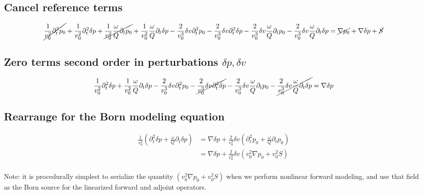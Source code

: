 \documentclass[10pt,fleqn]{article}
\begin{document}
\subsection{Cancel reference terms}
\begin{equation}
  \cancel{ \frac{1}{v_0^2} \partial_t^2 p_0 }
+ \frac{1}{v_0^2} \partial_t^2 \delta p
+ \cancel{ \frac{1}{v_0^2} \frac{\omega}{Q} \partial_t p_0 }
+ \frac{1}{v_0^2} \frac{\omega}{Q} \partial_t \delta p
- \frac{2}{v_0^3} \delta v \partial_t^2 p_0
- \frac{2}{v_0^3} \delta v \partial_t^2 \delta p 
- \frac{2}{v_0^3} \delta v \frac{\omega}{Q} \partial_t p_0
- \frac{2}{v_0^3} \delta v \frac{\omega}{Q} \partial_t \delta p 
= \cancel{ \nabla p_0 } + \nabla \delta p + \cancel{ S }
\end{equation}

\subsection{Zero terms second order in perturbations $\delta p,\delta v$ }
\begin{equation}
\frac{1}{v_0^2} \partial_t^2 \delta p
+ \frac{1}{v_0^2} \frac{\omega}{Q} \partial_t \delta p
- \frac{2}{v_0^3} \delta v \partial_t^2 p_0
- \cancel{ \frac{2}{v_0^3} \delta v \partial_t^2 \delta p }
- \frac{2}{v_0^3} \delta v \frac{\omega}{Q} \partial_t p_0
- \cancel{ \frac{2}{v_0^3} \delta v \frac{\omega}{Q} \partial_t \delta p }
= \nabla \delta p 
\end{equation}

\subsection{Rearrange for the Born modeling equation}
\begin{equation}
\begin{aligned}
\frac{1}{v_0^2} \left( \partial_t^2 \delta p + \frac{\omega}{Q} \partial_t \delta p \right) 
&= \nabla \delta p + \frac{2}{v_0^3} \delta v \left( \partial_t^2 p_0 + \frac{\omega}{Q} \partial_t p_0 \right) \\[10pt]
&= \nabla \delta p + \frac{2}{v_0^3} \delta v \left( v_0^2 \nabla p_0 + v_0^2 S \right) \\[10pt]
\end{aligned}
\end{equation}

Note: it is procedurally simplest to serialize the quantity
$\displaystyle \left( v_0^2 \nabla p_0 + v_0^2 S \right)$ when we perform nonlinear
forward modeling, and use that field as the Born source for the linearized forward
and adjoint operators.  
\end{document}
